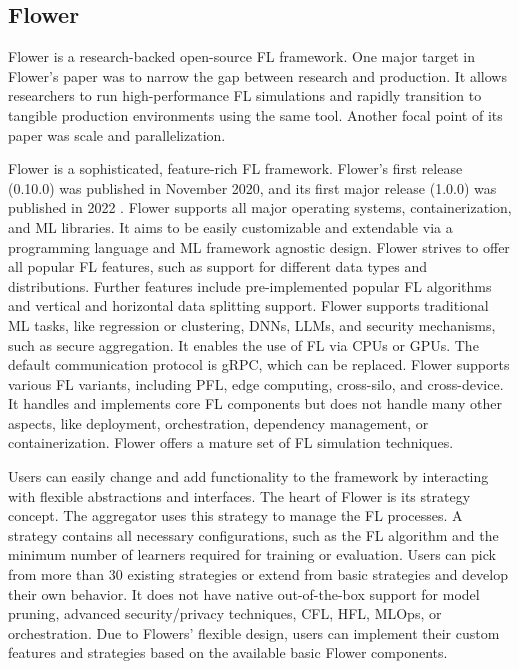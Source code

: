 \subsection{Flower} \label{subsection:flower}

Flower \cite{paper:flower} is a research-backed open-source FL framework.
One major target in Flower's paper was to narrow the gap between research and production.
It allows researchers to run high-performance FL simulations and rapidly transition to tangible production environments using the same tool.
Another focal point of its paper was scale and parallelization.

Flower is a sophisticated, feature-rich FL framework.
Flower's first release (0.10.0) was published in November 2020, and its first major release (1.0.0) was published in 2022 \cite{fl_framework:flower}.
Flower supports all major operating systems, containerization, and ML libraries.
It aims to be easily customizable and extendable via a programming language and ML framework agnostic design.
Flower strives to offer all popular FL features, such as support for different data types and distributions.
Further features include pre-implemented popular FL algorithms and vertical and horizontal data splitting support.
Flower supports traditional ML tasks, like regression or clustering, DNNs, LLMs, and security mechanisms, such as secure aggregation.
It enables the use of FL via CPUs or GPUs.
The default communication protocol is gRPC, which can be replaced.
Flower supports various FL variants, including PFL, edge computing, cross-silo, and cross-device.
It handles and implements core FL components but does not handle many other aspects, like deployment, orchestration, dependency management, or containerization.
Flower offers a mature set of FL simulation techniques.

Users can easily change and add functionality to the framework by interacting with flexible abstractions and interfaces.
The heart of Flower is its strategy concept.
The aggregator uses this strategy to manage the FL processes.
A strategy contains all necessary configurations, such as the FL algorithm and the minimum number of learners required for training or evaluation.
Users can pick from more than 30 existing strategies \cite{flower:strategies} or extend from basic strategies and develop their own behavior.
It does not have native out-of-the-box support for model pruning, advanced security/privacy techniques, CFL, HFL, MLOps, or orchestration.
Due to Flowers' flexible design, users can implement their custom features and strategies based on the available basic Flower components.

